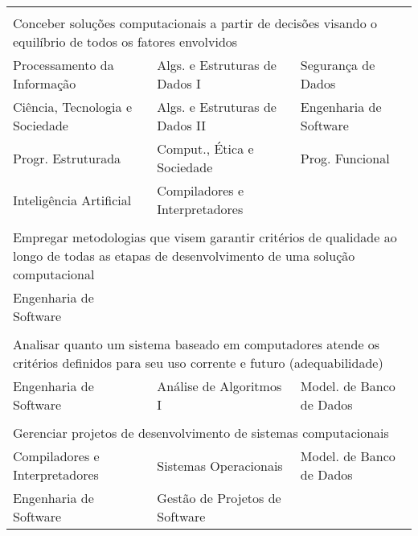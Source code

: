 \begin{longtable}{|p{}p{}p{}|}
    \multicolumn{3}{p{0.95\textwidth}}{}\\
    \multicolumn{3}{p{0.95\textwidth}}{Conceber soluções computacionais a partir de
    decisões visando o equilíbrio de todos os fatores envolvidos}\\
    \hline
    \textcolor{nred}{Processamento da Informação} &
    \textcolor{nblue}{Algs. e Estruturas de Dados I}&
    \textcolor{nblue}{Segurança de Dados}\\
    \textcolor{nred}{Ciência, Tecnologia e Sociedade} &
    \textcolor{nblue}{Algs. e Estruturas de Dados II}&
    \textcolor{nblue}{Engenharia de Software}\\
    \textcolor{nblue}{Progr. Estruturada} &
    \textcolor{nblue}{Comput., Ética e Sociedade}&
    \textcolor{nblue}{Prog. Funcional} \\
    \textcolor{nblue}{Inteligência Artificial} &
    \textcolor{nblue}{Compiladores e Interpretadores} & \\
    \hline
    
    \multicolumn{3}{p{0.95\textwidth}}{}\\
    \multicolumn{3}{p{0.95\textwidth}}{Empregar metodologias que visem garantir
    critérios de qualidade ao longo de todas as etapas de desenvolvimento de
    uma solução computacional}\\
    \hline
    \textcolor{nblue}{Engenharia de Software} & & \\
    \hline
    
    \multicolumn{3}{p{0.95\textwidth}}{}\\
    \multicolumn{3}{p{0.95\textwidth}}{Analisar quanto um sistema baseado em
    computadores atende os critérios definidos para seu uso corrente e futuro
    (adequabilidade)}\\
    \hline
    \textcolor{nblue}{Engenharia de Software} &
    \textcolor{nblue}{Análise de Algoritmos I} &
    \textcolor{nblue}{\small Model. de Banco de Dados}\\
    \hline
    
    \multicolumn{3}{p{0.95\textwidth}}{}\\
    \multicolumn{3}{p{0.95\textwidth}}{Gerenciar projetos de desenvolvimento de
    sistemas computacionais}\\
    \hline
    \textcolor{nblue}{Compiladores e Interpretadores} &
    \textcolor{nblue}{Sistemas Operacionais}&
    \textcolor{nblue}{\small Model. de Banco de Dados}\\
    \textcolor{nblue}{Engenharia de Software} &
    \textcolor{nyellow}{Gestão de Projetos de Software} & \\
    \hline
    

\end{longtable}
